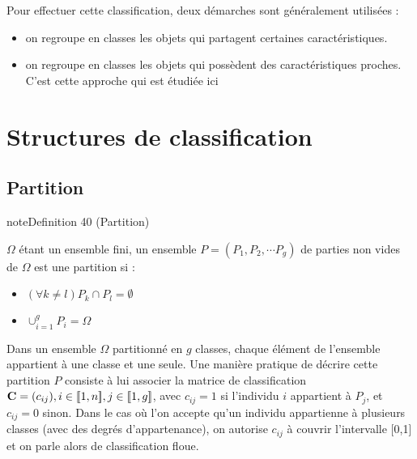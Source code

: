 \documentclass[letterpaper,10pt,english]{jupyterBook}
\begin{document}
\sphinxAtStartPar
Pour effectuer cette classification, deux démarches sont généralement utilisées :
\begin{itemize}
\item {} 
\sphinxAtStartPar
on regroupe en classes les objets qui partagent certaines caractéristiques.

\item {} 
\sphinxAtStartPar
on regroupe en classes les objets qui possèdent des caractéristiques proches. C’est cette approche qui est étudiée ici

\end{itemize}


\section{Structures de classification}
\label{\detokenize{clustering:structures-de-classification}}

\subsection{Partition}
\label{\detokenize{clustering:partition}}
\ignorespaces \label{clustering:definition-0}
\begin{sphinxadmonition}{note}{Definition 40 (Partition)}



\sphinxAtStartPar
\(\Omega\) étant un ensemble fini, un ensemble \(P =(P_1 ,P_2 ,\cdots  P_g )\) de parties non vides de   \(\Omega\) est une partition si :
\begin{itemize}
\item {} 
\sphinxAtStartPar
\((\forall k\neq l) P_k \cap P_l=\emptyset\)

\item {} 
\sphinxAtStartPar
\(\displaystyle\cup_{i=1}^gP_i=\Omega\)

\end{itemize}
\end{sphinxadmonition}

\sphinxAtStartPar
Dans un ensemble  \(\Omega\) partitionné en \(g\) classes, chaque élément de l’ensemble appartient à une classe et une seule. Une manière pratique de décrire cette partition \(P\) consiste à lui associer la matrice de classification \({\bf C}=(c_{ij}), i\in [\![1,n]\!], j\in [\![1,g]\!]\), avec \(c_{ij}=1\) si l’individu \(i\) appartient à \(P_j\), et \(c_{ij}=0\) sinon. Dans le cas où l’on accepte qu’un individu appartienne à plusieurs classes (avec des degrés d’appartenance), on autorise \(c_{ij}\) à couvrir l’intervalle {[}0,1{]} et on parle alors de classification floue.
\end{document}
